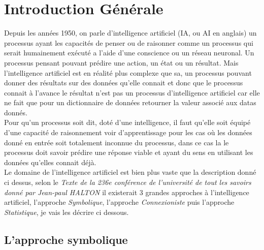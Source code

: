 \chapter{Introduction Générale}
\pagebreak

Depuis les années 1950, on parle d'intelligence artificiel (IA, ou AI en anglais) un processus ayant les capacités de penser ou de raisonner comme un processus qui serait humainement exécuté a l'aide d'une conscience ou un réseau neuronal. Un processus pensant pouvant prédire une action, un état ou un résultat. Mais l'intelligence artificiel est en réalité plus complexe que sa, un processus pouvant donner des résultats sur des données qu'elle connait et donc que le processus connait à l'avance le résultat n'est pas un processus d'intelligence artificiel car elle ne fait que pour un dictionnaire de données retourner la valeur associé aux datas donnés. \\
Pour qu'un processus soit dit, doté d'une intelligence, il faut qu'elle soit équipé d'une capacité de raisonnement voir d'apprentissage pour les cas où les données donné en entrée soit totalement inconnue du processus, dans ce cas la le processus doit savoir prédire une réponse viable et ayant du sens en utilisant les données qu'elles connait déjà.\\
\linebreak
Le domaine de l'intelligence artificiel est bien plus vaste que la description donné ci dessus, selon le \textit{Texte de la 236e conférence de l'université de tout les savoirs donné par Jean-paul HALTON} il existerait 3 grandes approches à l'intelligence artificiel, l'approche \emph{Symbolique}, l'approche \emph{Connexioniste} puis l'approche \emph{Statistique}, je vais les décrire ci dessous.

\pagebreak
\section{L'approche symbolique}

